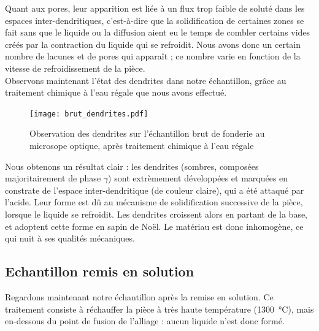 

Quant aux pores, leur apparition est liée à un flux trop faible de soluté 
dans les espaces inter-dendritiques, c'est-à-dire que la solidification de 
certaines zones se fait sans que le liquide ou la diffusion aient eu le 
temps de combler certains vides créés par la contraction du liquide qui
se refroidit. Nous avons donc un certain nombre de lacunes et de pores qui
apparaît ; ce nombre varie en fonction de la vitesse de refroidissement 
de la pièce.\\


Observons maintenant l'état des dendrites dans notre échantillon, grâce au 
traitement chimique à l'eau régale que nous avons effectué.\\ 


\begin{figure}[H]
    \centering
    \texttt{[image: brut\_dendrites.pdf]}
    \caption{Observation des dendrites sur l'échantillon brut de fonderie
     au microsope optique, après traitement chimique à l'eau régale}
    \label{fig:brut_dendrites_optique}
\end{figure}

Nous obtenons un résultat clair : les dendrites (sombres, composées majoritairement
de phase $\gamma$) sont extrèmement développées et marquées en constrate de 
l'espace inter-dendritique (de couleur claire), qui a été attaqué par l'acide. 
Leur forme est dû au mécanisme de solidification successive de la pièce, 
lorsque le liquide se refroidit. Les dendrites croissent alors en partant 
de la base, et adoptent cette forme en sapin de Noël. Le matériau est donc inhomogène, 
ce qui nuit à ses qualités mécaniques. \\


\subsection*{Echantillon remis en solution}

Regardons maintenant notre échantillon après la remise en solution. 
Ce traitement consiste à réchauffer la pièce à très haute température (\SI{1300}{\celsius}),
mais en-dessous du point de fusion de l'alliage : aucun liquide n'est donc formé. 

